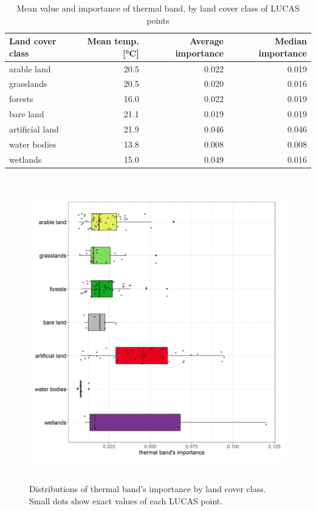 \documentclass{amuthesis}
\begin{document}
\hypertarget{tbl-tabela6}{}
\begin{table}
\caption{\label{tbl-tabela6}Mean value and importance of thermal band, by land cover class of LUCAS
points }\tabularnewline

\centering
\begin{tabular}{|>{}l|>{}r|>{}r|>{}r|}
\toprule
\textbf{Land cover class} & \textbf{Mean temp. [°C]} & \textbf{Average importance} & \textbf{Median importance}\\
\midrule
arable land & 20.5 & 0.022 & 0.019\\
\hline
grasslands & 20.5 & 0.020 & 0.016\\
\hline
forests & 16.0 & 0.022 & 0.019\\
\hline
bare land & 21.1 & 0.019 & 0.019\\
\hline
artificial land & 21.9 & 0.046 & 0.046\\
\hline
water bodies & 13.8 & 0.008 & 0.008\\
\hline
wetlands & 15.0 & 0.049 & 0.016\\
\bottomrule
\end{tabular}
\end{table}

\begin{figure}[H]

{\centering \includegraphics[width=5.05208in,height=5.20833in]{./figures/importance_classes.png}

}

\caption{\label{fig-rycina14}Distributions of thermal band's importance
by land cover class. Small dots show exact values of each LUCAS point.}

\end{figure}
\end{document}
